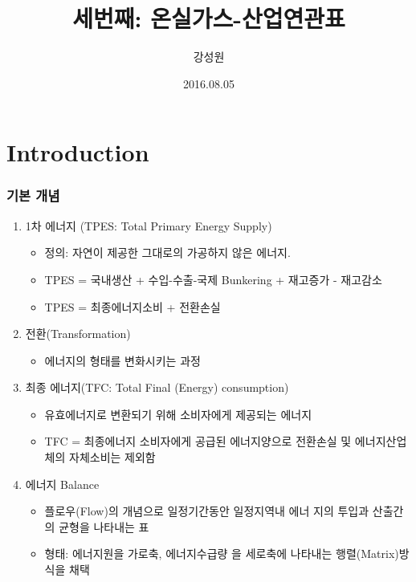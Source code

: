 \documentclass[10pt,compress,slidetop,%
			   hyperref={unicode},xcolor={svgnames},%
			   t]{beamer}
\title %
{세번째: 온실가스-산업연관표}
\author{강성원 }													%
\institute[] 															%
{KEI}													%
\date[08-11-09] 														%
{2016.08.05}																			%
\begin{document}
% 
\begin{frame}
  \titlepage
\end{frame}
%
\section{Introduction}

\begin{frame}
	\frametitle{기본 개념}
	\begin{enumerate}
	\item{1차 에너지 (TPES: Total Primary Energy Supply)}
		\begin{itemize}
		\item{정의: 자연이 제공한 그대로의 가공하지 않은 에너지.}
		\item{TPES = 국내생산 + 수입-수출-국제 Bunkering + 재고증가 - 재고감소}
		\item{TPES = 최종에너지소비 + 전환손실}
		\end{itemize}
	\item{전환(Transformation)}
		\begin{itemize}
		\item{에너지의 형태를 변화시키는 과정}
		\end{itemize}
	\item{최종 에너지(TFC: Total Final (Energy) consumption)}
      	\begin{itemize}
		\item{유효에너지로 변환되기 위해 소비자에게 제공되는 에너지}
		\item{TFC = 최종에너지 소비자에게 공급된 에너지양으로 전환손실 및 에너지산업체의 자체소비는 제외함 }
		\end{itemize}
	\item{에너지 Balance}
		\begin{itemize}
		\item{플로우(Flow)의 개념으로 일정기간동안 일정지역내 에너
지의 투입과 산출간의 균형을 나타내는 표}
		\item{형태: 에너지원을 가로축, 에너지수급량
을 세로축에 나타내는 행렬(Matrix)방식을 채택}
		\end{itemize}
	\end{enumerate}
	
\end{frame}
\end{document}
